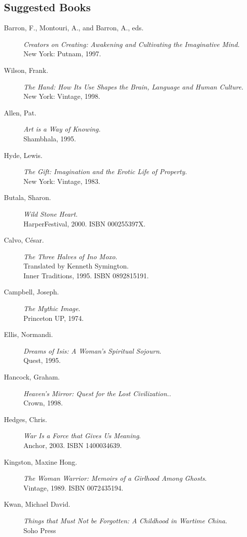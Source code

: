 \documentclass[letterpaper,10pt,headsepline]{scrreprt}
\begin{document}
\subsection{Suggested Books}
\begin{description}
\item [Barron, F., Montouri, A., and Barron, A., eds.] \textit{Creators on Creating: Awakening and Cultivating the Imaginative Mind.} 
\\New York: Putnam, 1997.
\item[Wilson, Frank.] \textit{The Hand: How Its Use Shapes the Brain, Language and Human Culture.}
\\New York: Vintage, 1998.
\item [Allen, Pat.] \textit{Art is a Way of Knowing.} \\Shambhala, 1995.
\item [Hyde, Lewis.] \textit{The Gift: Imagination and the Erotic Life of Property.} 
\\New York: Vintage, 1983.
\item [Butala, Sharon.] \textit{Wild Stone Heart}. \\HarperFestival,
  2000. \textsc{ISBN 000255397X}.
\item [Calvo, C\'esar.] \textit{The Three Halves of Ino Moxo}.
  \\Translated by Kenneth Symington. \\Inner Traditions, 1995.
  \textsc{ISBN 0892815191}.
\item [Campbell, Joseph.] \textit{The Mythic Image}.
  \\Princeton UP, 1974.
\item [Ellis, Normandi.] \textit{Dreams of Isis: A Woman's Spiritual
    Sojourn}.
  \\Quest, 1995.
\item [Hancock, Graham.] \textit{Heaven's Mirror: Quest for the Lost
    Civilization.}.
  \\Crown, 1998.
\item [Hedges, Chris.] \textit{War Is a Force that Gives Us Meaning}.
  \\Anchor, 2003. \textsc{ISBN 1400034639}.
\item [Kingston, Maxine Hong.] \textit{The Woman Warrior: Memoirs of a
    Girlhood Among Ghosts}. \\Vintage, 1989. \textsc{ISBN
    0072435194}.
\item [Kwan, Michael David.] \textit{Things that Must Not be
    Forgotten: A Childhood in Wartime China}. \\Soho Press

\end{description}
\end{document}
